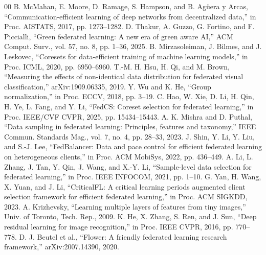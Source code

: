\documentclass[conference]{IEEEtran}
\begin{document}
\begin{thebibliography}{00}
 B. McMahan, E. Moore, D. Ramage, S. Hampson, and B. Ag\"{u}era y Arcas, ``Communication-efficient learning of deep networks from decentralized data,'' in Proc. AISTATS, 2017, pp. 1273--1282.
 D. Thakur, A. Guzzo, G. Fortino, and F. Piccialli, ``Green federated learning: A new era of green aware AI,'' ACM Comput. Surv., vol. 57, no. 8, pp. 1--36, 2025.
 B. Mirzasoleiman, J. Bilmes, and J. Leskovec, ``Coresets for data-efficient training of machine learning models,'' in Proc. ICML, 2020, pp. 6950--6960.
 T.-M. H. Hsu, H. Qi, and M. Brown, ``Measuring the effects of non-identical data distribution for federated visual classification,'' arXiv:1909.06335, 2019.
 Y. Wu and K. He, ``Group normalization,'' in Proc. ECCV, 2018, pp. 3--19.
 C. Hao, W. Xie, D. Li, H. Qin, H. Ye, L. Fang, and Y. Li, ``FedCS: Coreset selection for federated learning,'' in Proc. IEEE/CVF CVPR, 2025, pp. 15434--15443.
 A. K. Mishra and D. Puthal, ``Data sampling in federated learning: Principles, features and taxonomy,'' IEEE Commun. Standards Mag., vol. 7, no. 4, pp. 28--33, 2023.
 J. Shin, Y. Li, Y. Liu, and S.-J. Lee, ``FedBalancer: Data and pace control for efficient federated learning on heterogeneous clients,'' in Proc. ACM MobiSys, 2022, pp. 436--449.
 A. Li, L. Zhang, J. Tan, Y. Qin, J. Wang, and X.-Y. Li, ``Sample-level data selection for federated learning,'' in Proc. IEEE INFOCOM, 2021, pp. 1--10.
 G. Yan, H. Wang, X. Yuan, and J. Li, ``CriticalFL: A critical learning periods augmented client selection framework for efficient federated learning,'' in Proc. ACM SIGKDD, 2023.
 A. Krizhevsky, ``Learning multiple layers of features from tiny images,'' Univ. of Toronto, Tech. Rep., 2009.
 K. He, X. Zhang, S. Ren, and J. Sun, ``Deep residual learning for image recognition,'' in Proc. IEEE CVPR, 2016, pp. 770--778.
 D. J. Beutel et al., ``Flower: A friendly federated learning research framework,'' arXiv:2007.14390, 2020.
\end{thebibliography}
\end{document}
